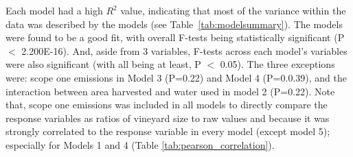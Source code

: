 \documentclass[review,12pt,authoryear]{elsarticle}
\begin{document}
\begin{linenumbers}
Each model had a high $R^2$ value, indicating that most of the variance within the data was described by the models (see Table~\ref{tab:modelsummary}). The models were found to be a good fit, with overall F-tests being statistically significant (P $<$ 2.200E-16). And, aside from 3 variables, F-tests across each model's variables were also significant (with all being at least, P $<$ 0.05). The three exceptions were: scope one emissions in Model 3 (P=0.22) and Model 4 (P=0.0.39), and the interaction between area harvested and water used in model 2 (P=0.22). Note that, scope one emissions was included in all models to directly compare the response variables as ratios of vineyard size to raw values and because it was strongly correlated to the response variable in every model (except model 5); especially for Models 1 and 4 (Table \ref{tab:pearson_correlation}). 
\par
\begin{table}[]
  \caption{Summary of models; their performance, F-statistics and Residual error.}\label{tab:modelsummary}
\end{table}
\end{linenumbers}
\end{document}
